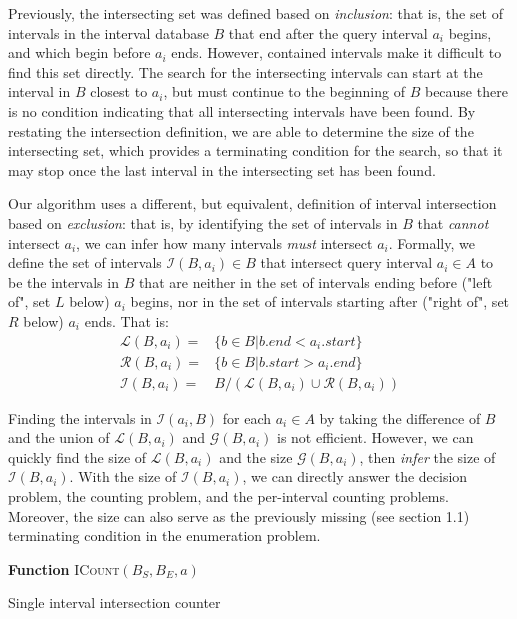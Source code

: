 \documentclass{bioinfo}
\begin{document}
	Previously, the intersecting set was defined based on \emph{inclusion}:
	that is, the set of intervals in the interval database $B$ that end after the query
	interval $a_i$ begins, and which begin before $a_i$ ends.  However,
	contained intervals make it difficult to find this set directly.  The
	search for the intersecting intervals can start at the interval in $B$
	closest to $a_i$, but must continue to the beginning of $B$ because
	there is no condition indicating that all intersecting intervals have
	been found.  By restating the intersection definition, we are able to
	determine the size of the intersecting set, which provides a
	terminating condition for the search, so that it may stop once the
	last interval in the intersecting set has been found.

	Our algorithm uses a different, but equivalent, definition of interval
	intersection based on \emph{exclusion}: that is, by identifying the set of 
	intervals in $B$ that \emph{cannot} intersect $a_i$, we can infer how many intervals
	\emph{must} intersect $a_i$. Formally, we define the set of intervals $\mathcal{I}(B,a_i) \in B$ that
	intersect query interval $a_i\in A$ to be the intervals in $B$ that
	are neither in the set of intervals ending before ("left of", set $L$ below) $a_i$ begins,
	nor in the set of intervals starting after ("right of", set $R$ below) $a_i$ ends.  That is:
	\begin{equation*}
		\begin{split}
			\mathcal{L}(B,a_i) = &\{b\in B| b.end < a_i.start\} \\
			\mathcal{R}(B,a_i) = &\{b\in B| b.start > a_i.end\} \\
			\mathcal{I}(B,a_i) = &B / (\mathcal{L}(B,a_i) \cup \mathcal{R}(B,a_i))
		\end{split}
	\end{equation*}

	Finding the intervals in $\mathcal{I}(a_i,B)$ for each $a_i\in A$ by
	taking the difference of $B$ and the union of $\mathcal{L}(B,a_i)$ and
	$\mathcal{G}(B,a_i)$ is not efficient.  However, we can quickly find
	the size of $\mathcal{L}(B,a_i)$ and the size $\mathcal{G}(B,a_i)$,
	then \emph{infer} the size of $\mathcal{I}(B,a_i)$.  With the size of
	$\mathcal{I}(B,a_i)$, we can directly answer the decision problem, the
	counting problem, and the per-interval counting problems.  Moreover,
	the size can also serve as the previously missing (see section 1.1) terminating
	condition in the enumeration problem.

	\begin{algorithm}[h]
		\DontPrintSemicolon
		\footnotesize
		\BlankLine
		\textbf{Function} \textsc{ICount}$(B_S,B_E,a)$
		\caption{Single interval intersection counter}
	\end{algorithm}
\end{document}
